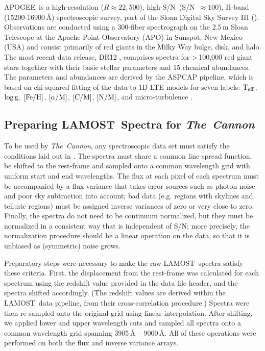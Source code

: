 \documentclass[12pt, letterpaper, preprint]{aastex}
\newcommand{\tc}{\textsl{The~Cannon}}
\newcommand{\apogee}{APOGEE}
\newcommand{\lamost}{LAMOST}
\newcommand{\teff}{\mbox{$\rm T_{eff}$}}
\newcommand{\feh}{\mbox{$\rm [Fe/H]$}}
\newcommand{\alpham}{\mbox{$\rm [\alpha/M]$}}
\newcommand{\logg}{\mbox{$\rm \log g$}}
\newcommand{\cm}{\mbox{$\rm [C/M]$}}
\newcommand{\nm}{\mbox{$\rm [N/M]$}}
\newcommand{\snr}{S/N}
\begin{document}
\apogee\ is a high-resolution ($R\approx22,500$), high-\snr\ (\snr\ $\approx100$), H-band (15200-16900\,$\mbox{\AA}$) spectroscopic survey, part of the Sloan Digital Sky
Survey III (\citet{Majewski2015,Eisenstein2011}). 
Observations are conducted using a 300-fiber spectrograph
\citep{Wilson2010} on the 2.5\,m Sloan Telescope
\citep{Gunn2006} at the Apache Point Observatory (APO) in Sunspot, New Mexico (USA) and consist primarily of
red giants in the Milky Way bulge, disk, and halo.
The most recent data release, DR12 \citep{Alam2015, Holtzman2015},
comprises spectra for \textgreater\,100,000 red giant stars together with their basic stellar parameters and 15 chemical
abundances. 
The parameters and abundances are 
derived by the ASPCAP pipeline, which is based on chi-squared fitting of the data to 1D LTE models for seven labels: \teff, \logg, \feh, \alpham, \cm, \nm, and micro-turbulence \citep{GarciaPerez2015}. 

\subsection{Preparing \lamost\ Spectra for \tc} 
\label{sec:normalization}

To be used by \tc, any spectroscopic data set must satisfy the conditions laid out in \citet{Ness2015}. 
The spectra must share a common line-spread function, be shifted to the rest-frame and sampled onto a common wavelength grid with uniform start and end wavelengths.
The flux at each pixel of each spectrum must be accompanied
by a flux variance that takes error sources such as photon noise and poor sky subtraction into account; 
bad data (e.g. regions with skylines and telluric regions) must be
assigned inverse variances of zero or very close to zero.
Finally, the spectra do not need to be continuum normalized, but they must be normalized
in a consistent way that is independent of S/N; 
more precisely, the normalization procedure should be a linear operation on the data, so that it is unbiased as (symmetric) noise grows. 

Preparatory steps were necessary to make the raw \lamost\ spectra
satisfy these criteria.
First, the displacement from the rest-frame was
calculated for each spectrum using the redshift value provided in 
the data file header, and the spectra shifted accordingly.
(The redshift values are derived within the \lamost\ 
data pipeline, 
from their cross-correlation procedure.)
Spectra were then re-sampled onto the original grid using linear interpolation. 
After shifting, we applied lower and upper wavelength cuts
and sampled all spectra onto a common wavelength grid 
spanning 3905\,$\mbox{\AA}$ -- 9000\,$\mbox{\AA}$.
All of these operations were performed on both the flux and inverse variance
arrays. 
\end{document}
